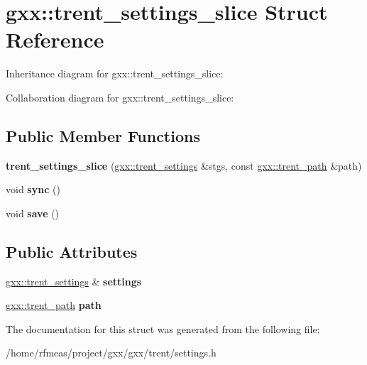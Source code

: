 \hypertarget{structgxx_1_1trent__settings__slice}{}\section{gxx\+:\+:trent\+\_\+settings\+\_\+slice Struct Reference}
\label{structgxx_1_1trent__settings__slice}


Inheritance diagram for gxx\+:\+:trent\+\_\+settings\+\_\+slice\+:


Collaboration diagram for gxx\+:\+:trent\+\_\+settings\+\_\+slice\+:
\subsection*{Public Member Functions}
\begin{DoxyCompactItemize}
\item 
{\bfseries trent\+\_\+settings\+\_\+slice} (\hyperlink{structgxx_1_1trent__settings}{gxx\+::trent\+\_\+settings} \&stgs, const \hyperlink{structgxx_1_1trent__path}{gxx\+::trent\+\_\+path} \&path)\hypertarget{structgxx_1_1trent__settings__slice_a08b40ff5e4a98b8471fc326a38831ede}{}\label{structgxx_1_1trent__settings__slice_a08b40ff5e4a98b8471fc326a38831ede}

\item 
void {\bfseries sync} ()\hypertarget{structgxx_1_1trent__settings__slice_a4410f4c32edadb33a037bbb2717d1fdd}{}\label{structgxx_1_1trent__settings__slice_a4410f4c32edadb33a037bbb2717d1fdd}

\item 
void {\bfseries save} ()\hypertarget{structgxx_1_1trent__settings__slice_a24e3384007140ed96086b6316005ca01}{}\label{structgxx_1_1trent__settings__slice_a24e3384007140ed96086b6316005ca01}

\end{DoxyCompactItemize}
\subsection*{Public Attributes}
\begin{DoxyCompactItemize}
\item 
\hyperlink{structgxx_1_1trent__settings}{gxx\+::trent\+\_\+settings} \& {\bfseries settings}\hypertarget{structgxx_1_1trent__settings__slice_a596dfeac2a2cdbb2290d2a3cdb3a877c}{}\label{structgxx_1_1trent__settings__slice_a596dfeac2a2cdbb2290d2a3cdb3a877c}

\item 
\hyperlink{structgxx_1_1trent__path}{gxx\+::trent\+\_\+path} {\bfseries path}\hypertarget{structgxx_1_1trent__settings__slice_ad2cbf428830d320b8672c2226292d612}{}\label{structgxx_1_1trent__settings__slice_ad2cbf428830d320b8672c2226292d612}

\end{DoxyCompactItemize}


The documentation for this struct was generated from the following file\+:\begin{DoxyCompactItemize}
\item 
/home/rfmeas/project/gxx/gxx/trent/settings.\+h\end{DoxyCompactItemize}
